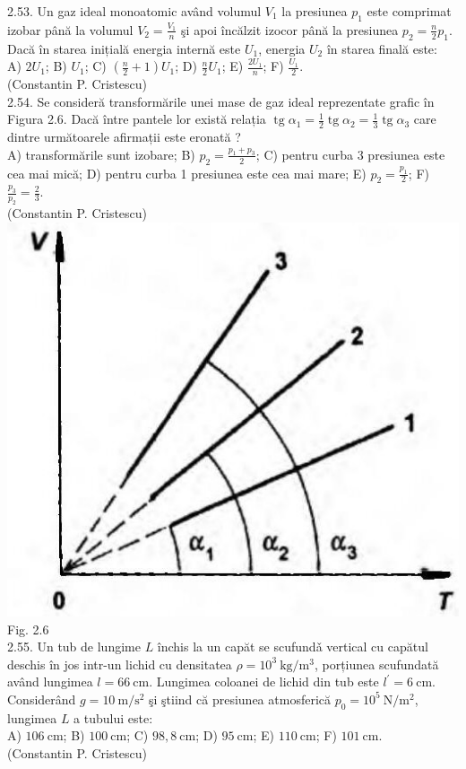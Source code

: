 2.53. Un gaz ideal monoatomic având volumul $V_{1}$ la presiunea $p_{1}$ este comprimat izobar până la volumul $V_{2}=\frac{V_{1}}{n}$ şi apoi încălzit izocor până la presiunea $p_{2}=\frac{n}{2} p_{1}$. Dacă în starea inițială energia internă este $U_{1}$, energia $U_{2}$ în starea finală este:\\ A) $2 U_{1}$; B) $U_{1}$; C) $\left(\frac{n}{2}+1\right) U_{1}$; D) $\frac{n}{2} U_{1}$; E) $\frac{2 U_{1}}{n}$; F) $\frac{U_{1}}{2}$.\\ (Constantin P. Cristescu)\\

2.54. Se consideră transformările unei mase de gaz ideal reprezentate grafic în Figura 2.6. Dacă între pantele lor există relația $\operatorname{tg} \alpha_{1}=\frac{1}{2} \operatorname{tg} \alpha_{2}=\frac{1}{3} \operatorname{tg} \alpha_{3}$ care dintre următoarele afirmații este eronată ?\\ A) transformările sunt izobare; B) $p_{2}=\frac{p_{1}+p_{3}}{2}$; C) pentru curba 3 presiunea este cea mai mică; D) pentru curba 1 presiunea este cea mai mare; E) $p_{2}=\frac{p_{1}}{2}$; F) $\frac{p_{3}}{p_{2}}=\frac{2}{3}$.\\ (Constantin P. Cristescu)\\ \includegraphics[width=0.4\linewidth]{images/2025_07_01_5b3ff9fa0d508c8e9f17g-084(1)} Fig. 2.6\\

2.55. Un tub de lungime $L$ închis la un capăt se scufundǎ vertical cu capătul deschis în jos intr-un lichid cu densitatea $\rho=10^{3} \mathrm{~kg} / \mathrm{m}^{3}$, porțiunea scufundată având lungimea $l=66 \mathrm{~cm}$. Lungimea coloanei de lichid din tub este $l^{\prime}=6 \mathrm{~cm}$. Considerând $g=10 \mathrm{~m} / \mathrm{s}^{2}$ şi ştiind că presiunea atmosferică $p_{0}=10^{5} \mathrm{~N} / \mathrm{m}^{2}$, lungimea $L$ a tubului este:\\ A) $106 \mathrm{~cm}$; B) $100 \mathrm{~cm}$; C) $98,8 \mathrm{~cm}$; D) $95 \mathrm{~cm}$; E) $110 \mathrm{~cm}$; F) $101 \mathrm{~cm}$.\\ (Constantin P. Cristescu)\\

